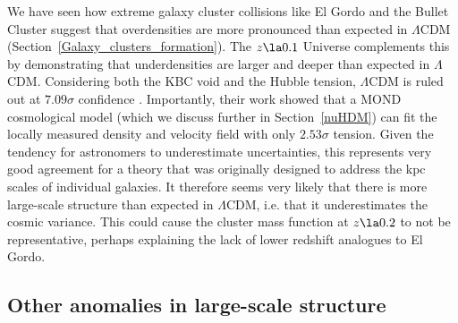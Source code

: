 \documentclass[fleqn,usenatbib,useAMS,onecolumn]{mnras} %
\begin{document}
We have seen how extreme galaxy cluster collisions like El Gordo and the Bullet Cluster suggest that overdensities are more pronounced than expected in $\Lambda$CDM (Section~\ref{Galaxy_clusters_formation}). The $z \la 0.1$ Universe complements this by demonstrating that underdensities are larger and deeper than expected in $\Lambda$CDM. Considering both the KBC void and the Hubble tension, $\Lambda$CDM is ruled out at $7.09\sigma$ confidence \citep{Haslbauer_2020}. Importantly, their work showed that a MOND cosmological model (which we discuss further in Section~\ref{nuHDM}) can fit the locally measured density and velocity field with only $2.53\sigma$ tension. Given the tendency for astronomers to underestimate uncertainties, this represents very good agreement for a theory that was originally designed to address the kpc scales of individual galaxies. It therefore seems very likely that there is more large-scale structure than expected in $\Lambda$CDM, i.e. that it underestimates the cosmic variance. This could cause the cluster mass function at $z \la 0.2$ to not be representative, perhaps explaining the lack of lower redshift analogues to El Gordo.



\subsection{Other anomalies in large-scale structure}
\label{Other_anomalies_LSS}
\end{document}
